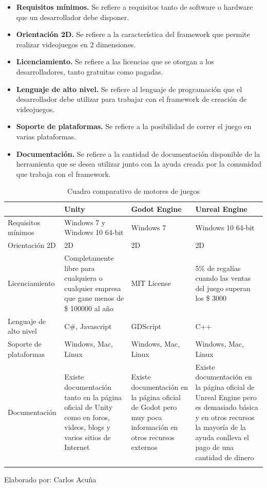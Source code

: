 \documentclass[a4paper, openright, 12pt]{report}
\begin{document}
\begin{itemize}
\item \textbf{Requisitos mínimos.} Se refiere a requisitos tanto de software o hardware que un desarrollador debe disponer.

\item \textbf{Orientación 2D.} Se refiere a la característica del framework que permite realizar videojuegos en 2 dimensiones.

\item \textbf{Licenciamiento.} Se refiere a las licencias que se otorgan a los desarrolladores, tanto gratuitas como pagadas.

\item \textbf{Lenguaje de alto nivel.} Se refiere al lenguaje de programación que el desarrollador debe utilizar para trabajar con el framework de creación de videojuegos.

\item \textbf{Soporte de plataformas.} Se refiere a la posibilidad de correr el juego en varias plataformas.

\item \textbf{Documentación.} Se refiere a la cantidad de documentación disponible de la herramienta que se desea utilizar junto con la ayuda creada por la comunidad que trabaja con el framework.
\end{itemize}
\clearpage

\begin{longtable}{| p{3cm} | p{3cm} | p{3cm} | p{3cm} |}
\hline
\captionsetup{justification=centering,margin=2cm}
\textbf{} & \textbf{Unity} & \textbf{Godot Engine} & \textbf{Unreal Engine} \\ \hline
Requisitos mínimos & Windows 7 y Windows 10 64-bit 
& Windows 7 
& Windows 10 64-bit
 \\ \hline
Orientación 2D & 2D
& 2D
& 2D
 \\ \hline
Licenciamiento & Completamente libre para cualquiera o cualquier empresa que gane menos de \$ 100000 al año
 & MIT License 
 & 5\% de regalías cuando las ventas del juego superan los \$ 3000
 \\ \hline
Lenguaje de alto nivel & C\#, Javascript
 & GDScript
 & C++
 \\ \hline
Soporte de plataformas & Windows, Mac, Linux
 & Windows, Mac, Linux  
 & Windows, Mac, Linux
 \\ \hline
Documentación & Existe documentación tanto en la página oficial de Unity como en foros, videos, blogs y varios sitios de Internet 
 & Existe documentación en la página oficial de Godot pero muy poca información en otros recursos externos
 & Existe documentación en la página oficial de Unreal Engine pero es demasiado básica y en otros recursos la mayoría de la ayuda conlleva el pago de una cantidad de dinero\\ \hline

\caption{Cuadro comparativo de motores de juegos}
\label{t:comparacionF}
\end{longtable}
\begin{center}
Elaborado por: Carlos Acuña
\end{center}
\end{document}
